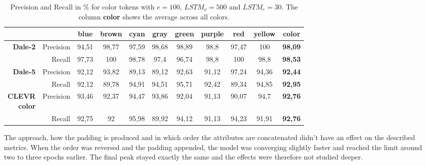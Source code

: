 \begin{table}[ht]
    \centering
    \begin{tabular}{rr|cccccccc|c}
        \toprule
                                         &             & {blue}  & {brown} & {cyan}  & {gray}  & {green} & {purple} & {red}   & {yellow} & \textbf{color} \\\midrule
        \multirow{2}{*}{\textbf{Dale-2}} & {Precision} & {94,51} & {98,77} & {97,59} & {98,68} & {98,89} & {98,8}   & {97,47} & {100}    & \textbf{98,09} \\
                                         & {Recall}    & {97,73} & {100}   & {98,78} & {97,4}  & {96,74} & {98,8}   & {100}   & {98,8}   & \textbf{98,53} \\\midrule
        \multirow{2}{*}{\textbf{Dale-5}} & {Precision} & {92,12} & {93,82} & {89,13} & {89,12} & {92,63} & {91,12}  & {97,24} & {94,36}  & \textbf{92,44} \\
                                         & {Recall}    & {92,12} & {89,78} & {94,91} & {94,51} & {95,71} & {92,42}  & {89,34} & {94,85}  & \textbf{92,95} \\\midrule
        \multirowcell{2}[0pt][r]{\textbf{CLEVR}                                                                                                           \\\textbf{color}} & {Precision}           & {93,46} & {92,37} & {94,47} & {93,86} & {92,04} & {91,13}  & {90,07} & {94,7}   & \textbf{92,76} \\
                                         & {Recall}    & {92,75} & {92}    & {95,98} & {89,92} & {94,12} & {91,13}  & {94,23} & {91,91}  & \textbf{92,76} \\
        \bottomrule
    \end{tabular}
    \caption{Precision and Recall in \% for color tokens with $e=100$, $LSTM_o=500$ and $LSTM_e=30$. The column \textbf{color} shows the average across all colors.}
    \label{tab:results:bb-re-generator_color}
\end{table}

The approach, how the padding is produced and in which order the attributes are concatenated didn't have an effect on the described metrics.
When the order was reversed and the padding appended, the model was converging slightly faster and reached the limit around two to three epochs earlier.
The final peak stayed exactly the same and the effects were therefore not studied deeper.

